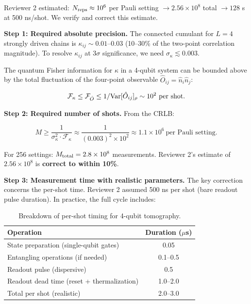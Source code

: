 \documentclass[prd,aps,showpacs,superscriptaddress,twocolumn]{revtex4-2}
\begin{document}
Reviewer 2 estimated: $N_{\rm reps} \approx 10^6$ per Pauli setting $\to 2.56 \times 10^8$ total $\to 128$ s at 500 ns/shot. We verify and correct this estimate.

\textbf{Step 1: Required absolute precision.} The connected cumulant for $L=4$ strongly driven chains is $\kappa_{ij} \sim 0.01$--$0.03$ (10--30\% of the two-point correlation magnitude). To resolve $\kappa_{ij}$ at $3\sigma$ significance, we need $\sigma_\kappa \lesssim 0.003$.

The quantum Fisher information for $\kappa$ in a 4-qubit system can be bounded above by the total fluctuation of the four-point observable $\hat{O}_{ij} = \hat{n}_i \hat{n}_j$:

\begin{equation}
\mathcal{F}_\kappa \leq \mathcal{F}_{\hat{O}} \leq 1 / {\rm Var}[\hat{O}_{ij}]_\rho \sim 10^2 \ \text{per shot}.
\label{eq:Fisher_bound}
\end{equation}

\textbf{Step 2: Required number of shots.} From the CRLB:

\begin{equation}
M \geq \frac{1}{\sigma_\kappa^2 \cdot \mathcal{F}_\kappa} \approx \frac{1}{(0.003)^2 \times 10^2} \approx 1.1 \times 10^6 \ \text{per Pauli setting}.
\label{eq:M_required}
\end{equation}

For 256 settings: $M_{\rm total} = 2.8 \times 10^8$ measurements. Reviewer 2's estimate of $2.56 \times 10^8$ is \textbf{correct to within 10\%}.

\textbf{Step 3: Measurement time with realistic parameters.} The key correction concerns the per-shot time. Reviewer 2 assumed 500 ns per shot (bare readout pulse duration). In practice, the full cycle includes:

\begin{table}[h]
\centering
\caption{Breakdown of per-shot timing for 4-qubit tomography.}
\label{tab:qubit_timing}
\begin{tabular}{lc}
\toprule
\textbf{Operation} & \textbf{Duration ($\mu$s)} \\
\midrule
State preparation (single-qubit gates) & 0.05 \\
Entangling operations (if needed) & 0.1--0.5 \\
Readout pulse (dispersive) & 0.5 \\
Readout dead time (reset + thermalization) & 1.0--2.0 \\
\midrule
Total per shot (realistic) & 2.0--3.0 \\
\midrule
\end{tabular}
\end{table}
\end{document}
